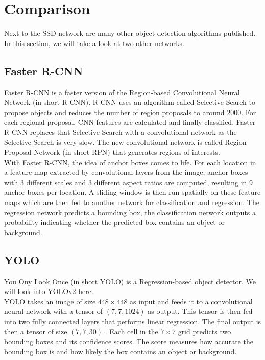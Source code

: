 
\section{Comparison}
\label{section:comparison}

Next to the SSD network are many other object detection algorithms published. In this section, we will take a look at two other networks.

\subsection{Faster R-CNN}

Faster R-CNN \cite{fasterrcnn2015} is a faster version of the Region-based Convolutional Neural Network (in short R-CNN). R-CNN uses an algorithm called Selective Search to propose objects and reduces the number of region proposals to around 2000. For each regional proposal, CNN features are calculated and finally classified. Faster R-CNN replaces that Selective Search with a convolutional network as the Selective Search is very slow. The new convolutional network is called Region Proposal Network (in short RPN) that generates regions of interests. \\

With Faster R-CNN, the idea of anchor boxes comes to life. For each location in a feature map extracted by convolutional layers from the image, anchor boxes with 3 different scales and 3 different aspect ratios are computed, resulting in 9 anchor boxes per location. A sliding window is then run spatially on these feature maps which are then fed to another network for classification and regression. The regression network predicts a bounding box, the classification network outputs a probability indicating whether the predicted box contains an object or background.

\subsection{YOLO}

You Ony Look Once (in short YOLO) \cite{yolo2016} is a Regression-based object detector. We will look into YOLOv2 here. \\

YOLO takes an image of size $448 \times 448$ as input and feeds it to a convolutional neural network with a tensor of $(7, 7, 1024)$ as output. This tensor is then fed into two fully connected layers that performs linear regression. The final output is then a tensor of size $(7, 7, 30)$ . Each cell in the $7 \times 7$ grid predicts two bounding boxes and its confidence scores. The score measures how accurate the bounding box is and how likely the box contains an object or background.
